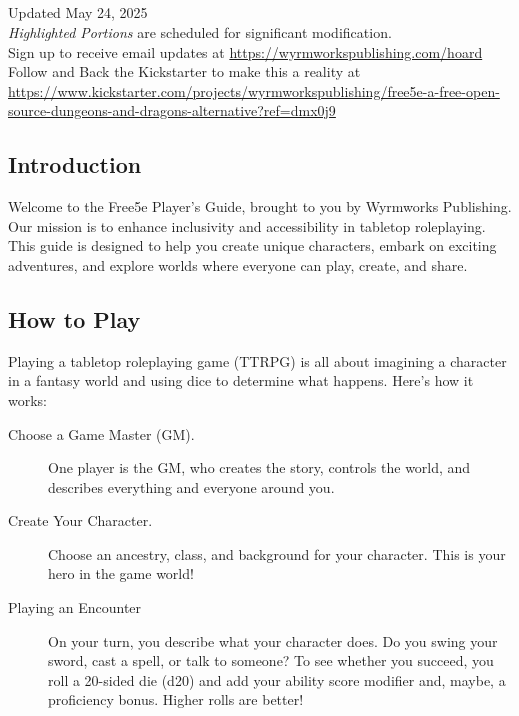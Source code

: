 \subsection{}

Updated May 24, 2025\\
\emph{Highlighted Portions} are scheduled for significant
modification.\\
Sign up to receive email updates at
\url{https://wyrmworkspublishing.com/hoard}\\
Follow and Back the Kickstarter to make this a reality at
\url{https://www.kickstarter.com/projects/wyrmworkspublishing/free5e-a-free-open-source-dungeons-and-dragons-alternative?ref=dmx0j9}

\subsection{Introduction}\label{_introduction}

Welcome to the Free5e Player's Guide, brought to you by Wyrmworks
Publishing. Our mission is to enhance inclusivity and accessibility in
tabletop roleplaying. This guide is designed to help you create unique
characters, embark on exciting adventures, and explore worlds where
everyone can play, create, and share.

\subsection{How to Play}\label{_how_to_play}

Playing a tabletop roleplaying game (TTRPG) is all about imagining a
character in a fantasy world and using dice to determine what happens.
Here's how it works:

\begin{description}
\item[Choose a Game Master (GM).]
One player is the GM, who creates the story, controls the world, and
describes everything and everyone around you.
\item[Create Your Character.]
Choose an ancestry, class, and background for your character. This is
your hero in the game world!
\item[Playing an Encounter]
On your turn, you describe what your character does. Do you swing your
sword, cast a spell, or talk to someone? To see whether you succeed, you
roll a 20-sided die (d20) and add your ability score modifier and,
maybe, a proficiency bonus. Higher rolls are better!
\end{description}


